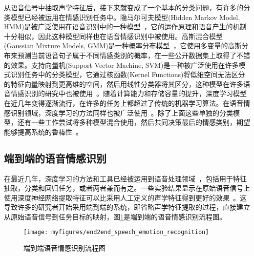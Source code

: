 从语音信号中抽取声学特征后，接下来就变成了一个基本的分类问题，有许多的分类模型已经被运用在情感识别任务中。隐马尔可夫模型(Hidden Markov Model, HMM)是被广泛使用在语音识别中的一种模型~\cite{Rabiner2007An, Ephraim2002Hidden, Schuller2003Hidden, Nogueiras2012Speech, Kwon2003Emotion, Lee2004Emotion}，它的运作原理和语音产生的机制十分相似，因此这种模型同样也在语音情感识别中被使用。高斯混合模型(Gaussian Mixture Models, GMM)是一种概率分布模型~\cite{Vlassis2002A, Reynolds1995Robust, Rissanen1978Modeling, El2004On, Vlassis1999A, Breazeal2002Recognition, Slaney2003Baby}，它使用多变量的高斯分布来预测当前语音句子属于不同情感类别的概率，在一些公开数据集上取得了不错的效果。支持向量机(Support Vector Machine, SVM)是一种被广泛使用在许多模式识别任务中的分类模型，它通过核函数(Kernel Functions)将低维空间无法区分的特征向量映射到更高维的空间，然后用线性分类器将其区分，这种模型在许多语音情感识别的研究中也被使用~\cite{Burges2008A, Schuller2004Speech, Pierre2003The}。随着计算能力和存储容量的提升，深度学习模型在近几年变得逐渐流行，在许多的任务上都超过了传统的机器学习算法。在语音情感识别领域，深度学习的方法同样也被广泛使用~\cite{Carpenter1989Neural, Nicholson2000Emotion, Crystal1978Linear, Hozjan2003Context, Petrushin2000EMOTION}。除了上面这些单独的分类模型，还有一些工作尝试将多种模型混合使用，然后共同决策最后的情感类别，期望能够提高系统的鲁棒性~\cite{Schuller2005Robust, Kuncheva2004Combining, Lugger2015Combining, Mashao2006Combining, Wu2005Linear, Kuncheva2002A}。

\subsection{端到端的语音情感识别}
\label{ssec:end2end_emo_rec}
在最近几年，深度学习的方法和工具已经被运用到语音处理领域~\cite{Han2014Speech, Lee2015High, Huang2014Speech, Le2013Emotion, Rana2016Emotion, Chernykh2017Emotion}，包括用于特征抽取，分类和回归任务，或者两者兼而有之。一些实验结果显示在原始语音信号上使用深度神经网络提取特征可以比采用人工定义的声学特征得到更好的效果~\cite{Trigeorgis2016Adieu}。这导致许多的研究者开始采用端到端的系统，即省略声学特征提取的过程，直接建立从原始语音信号到任务目标的映射，图\ref{fig:end2end_speech_emotion_recognition}是端到端的语音情感识别流程图。

\begin{figure}[htb] %
    \centering
    \texttt{[image: myfigures/end2end\_speech\_emotion\_recognition]}
    \caption{端到端语音情感识别流程图}
    \label{fig:end2end_speech_emotion_recognition}
\end{figure}

